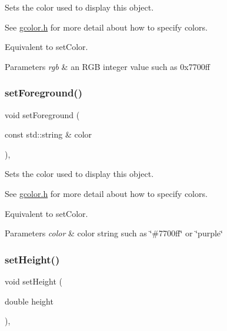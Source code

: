 Sets the color used to display this object. 

See \mbox{\hyperlink{gcolor_8h_source}{gcolor.\+h}} for more detail about how to specify colors.

Equivalent to set\+Color.


\begin{DoxyParams}{Parameters}
{\em rgb} & an R\+GB integer value such as 0x7700ff \\
\hline
\end{DoxyParams}
\mbox{\label{classsgl_1_1GObject_af59209aeadea6dfc6d97a2d8531f50e1}} 
\subsubsection{\texorpdfstring{set\+Foreground()}{setForeground()}\hspace{0.1cm}{\footnotesize\ttfamily [3/3]}}
{\footnotesize\ttfamily void set\+Foreground (\begin{DoxyParamCaption}\item[{const std\+::string \&}]{color }\end{DoxyParamCaption})\hspace{0.3cm}{\ttfamily [virtual]}, {\ttfamily [inherited]}}



Sets the color used to display this object. 

See \mbox{\hyperlink{gcolor_8h_source}{gcolor.\+h}} for more detail about how to specify colors.

Equivalent to set\+Color.


\begin{DoxyParams}{Parameters}
{\em color} & color string such as \char`\"{}\#7700ff\char`\"{} or \char`\"{}purple\char`\"{} \\
\hline
\end{DoxyParams}
\mbox{\label{classsgl_1_1GObject_a9e280bfc4544dfaf8e4376c4e1a74357}} 
\subsubsection{\texorpdfstring{set\+Height()}{setHeight()}}
{\footnotesize\ttfamily void set\+Height (\begin{DoxyParamCaption}\item[{double}]{height }\end{DoxyParamCaption})\hspace{0.3cm}{\ttfamily [virtual]}, {\ttfamily [inherited]}}



